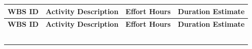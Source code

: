 \documentclass[10pt,letterpaper]{article}
\renewcommand\arraystretch{1.25}
\begin{document}
\begin{center}
\begingroup
\setlength\tabcolsep{2.0pt}
\footnotesize
\renewcommand\arraystretch{1.55}
\begin{longtable}{|>{\raggedright\arraybackslash}p{1.558in}|>{\raggedright\arraybackslash}p{1.558in}|>{\raggedright\arraybackslash}p{1.558in}|>{\raggedright\arraybackslash}p{1.558in}|}
\hline
\rowcolor{light}
\textbf{WBS ID} & \textbf{Activity Description} & \textbf{Effort Hours} & \textbf{Duration Estimate} \\ \hline
\endfirsthead
\hline\rowcolor{light} \textbf{WBS ID} & \textbf{Activity Description} & \textbf{Effort Hours} & \textbf{Duration Estimate} \\ \hline
\endhead
\rule{0pt}{11pt}\hspace{0pt} & \rule{0pt}{11pt}\hspace{0pt} & \rule{0pt}{11pt}\hspace{0pt} & \rule{0pt}{11pt}\hspace{0pt} \\ \hline
\rule{0pt}{11pt}\hspace{0pt} & \rule{0pt}{11pt}\hspace{0pt} & \rule{0pt}{11pt}\hspace{0pt} & \rule{0pt}{11pt}\hspace{0pt} \\ \hline
\rule{0pt}{11pt}\hspace{0pt} & \rule{0pt}{11pt}\hspace{0pt} & \rule{0pt}{11pt}\hspace{0pt} & \rule{0pt}{11pt}\hspace{0pt} \\ \hline
\rule{0pt}{11pt}\hspace{0pt} & \rule{0pt}{11pt}\hspace{0pt} & \rule{0pt}{11pt}\hspace{0pt} & \rule{0pt}{11pt}\hspace{0pt} \\ \hline
\rule{0pt}{11pt}\hspace{0pt} & \rule{0pt}{11pt}\hspace{0pt} & \rule{0pt}{11pt}\hspace{0pt} & \rule{0pt}{11pt}\hspace{0pt} \\ \hline
\end{longtable}
\endgroup
\end{center}
\end{document}
